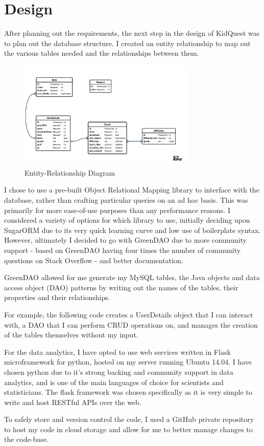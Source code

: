 \chapter{Design}

After planning out the requirements, the next step in the design of KidQuest was to plan out the database structure.
I created an entity relationship to map out the various tables needed and the relationships between them.

\begin{figure}[t]
	\centering
	\includegraphics[width=0.75\textwidth]{images/entityRelationshipDiagram.png}
	\caption{Entity-Relationship Diagram}
	\label{fig:ERD}
\end{figure}

I chose to use a pre-built Object Relational Mapping library to interface with the database, rather than crafting particular queries on an ad hoc basis.
This was primarily for more ease-of-use purposes than any performance reasons. 
I considered a variety of options for which library to use, initially deciding upon SugarORM due to its very quick learning curve and low use of boilerplate syntax. 
However, ultimately I decided to go with GreenDAO \citep{greendao} due to more community support - based on GreenDAO having four times the number of community questions on Stack Overflow - and better documentation.

GreenDAO allowed for me generate my MySQL tables, the Java objects and data access object (DAO) patterns by writing out the names of the tables, their properties and their relationships. 

For example, the following code creates a UserDetails object that I can interact with, a DAO that I can perform CRUD operations on, and manages the creation of the tables themselves without my input.


For the data analytics, I have opted to use web services written in Flask microframework for python, hosted on my server running Ubuntu 14.04. 
I have chosen python due to it's strong backing and community support in data analytics, and is one of the main languages of choice for scientists and statisticians.
The flask framework was chosen specifically as it is very simple to write and host RESTful APIs over the web.

To safely store and version control the code, I used a GitHub private repository to host my code in cloud storage and allow for me to better manage changes to the code-base.

